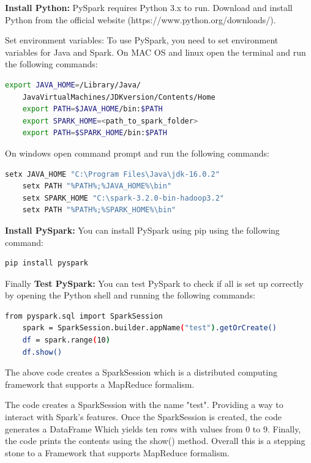 \documentclass[]{final_report}
\begin{document}
\textbf{Install Python:} PySpark requires Python 3.x to run. Download and install Python from the official website (https://www.python.org/downloads/).

Set environment variables: To use PySpark, you need to set environment variables for Java and Spark. On MAC OS and linux open the terminal and run the following commands:

\begin{lstlisting}[language=bash]
    export JAVA_HOME=/Library/Java/
    JavaVirtualMachines/JDKversion/Contents/Home
    export PATH=$JAVA_HOME/bin:$PATH
    export SPARK_HOME=<path_to_spark_folder>
    export PATH=$SPARK_HOME/bin:$PATH
\end{lstlisting}

On windows open command prompt and run the following commands:
\begin{lstlisting}[language=bash]
    setx JAVA_HOME "C:\Program Files\Java\jdk-16.0.2"
    setx PATH "%PATH%;%JAVA_HOME%\bin"
    setx SPARK_HOME "C:\spark-3.2.0-bin-hadoop3.2"
    setx PATH "%PATH%;%SPARK_HOME%\bin"
\end{lstlisting}

\textbf{Install PySpark:} You can install PySpark using pip using the following command:

\begin{lstlisting}[language=bash]
    pip install pyspark
\end{lstlisting}

Finally \textbf{Test PySpark:} You can test PySpark to check if all is set up correctly by opening the Python shell and running the following commands:

\begin{lstlisting}[language=bash]
    from pyspark.sql import SparkSession
    spark = SparkSession.builder.appName("test").getOrCreate()
    df = spark.range(10)
    df.show()
\end{lstlisting}

The above code creates a SparkSession which is a distributed computing framework that supports a MapReduce formalism.

The code creates a SparkSession with the name "test". Providing a way to interact with Spark's features. Once the SparkSession is created, the code generates a DataFrame Which yields ten rows with values from 0 to 9. Finally, the code prints the contents using the show() method. Overall this is a stepping stone to a Framework that supports MapReduce formalism.

\clearpage
\end{document}
